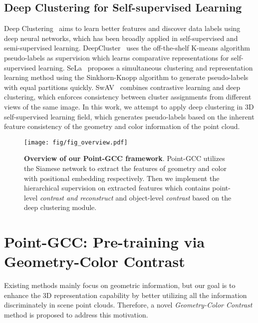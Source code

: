 \documentclass{article}
\begin{document}
\subsection{Deep Clustering for Self-supervised Learning}
\vspace{-0.25cm}
Deep Clustering~\citep{long2015learning, caron2018deep, chang2017deep, xie2016unsupervised, bachman2019learning, caron2020unsupervised, DeepAlignedClustering} aims to learn better features and discover data labels using deep neural networks, which has been broadly applied in self-supervised and semi-supervised learning. DeepCluster~\cite{DeepCluster} uses the off-the-shelf K-means algorithm  pseudo-labels as supervision which learns comparative representations for self-supervised learning.
SeLa~\cite{SELA} proposes a simultaneous clustering and representation learning method using the Sinkhorn-Knopp algorithm to generate pseudo-labels with equal partitions quickly. SwAV~\cite{SWAV} combines contrastive learning and deep clustering, which enforces consistency between cluster assignments from different views of the same image. In this work, we attempt to apply deep clustering in 3D self-supervised learning field, which generates pseudo-labels based on the inherent feature consistency of the geometry and color information of the point cloud. \begin{figure}[ht!]
  \begin{center}
\texttt{[image: fig/fig\_overview.pdf]}
  \vspace{-5pt}
  \caption{\textbf{Overview of our Point-GCC framework}. Point-GCC utilizes the Siamese network to extract the features of geometry and color with positional embedding respectively. Then we implement the hierarchical supervision on extracted features which contains point-level \textit{contrast and reconstruct} and object-level \textit{contrast} based on the deep clustering module.}\label{fig:archi}
  \end{center}
  \vspace{-25pt}
\end{figure} \section{Point-GCC: Pre-training via Geometry-Color Contrast}
\vspace{-0.2cm}
Existing methods mainly focus on geometric information, but our goal is to enhance the 3D representation capability by better utilizing all the information discriminately in scene point clouds. Therefore, a novel \textit{Geometry-Color Contrast} method is proposed to address this motivation. 
\end{document}
